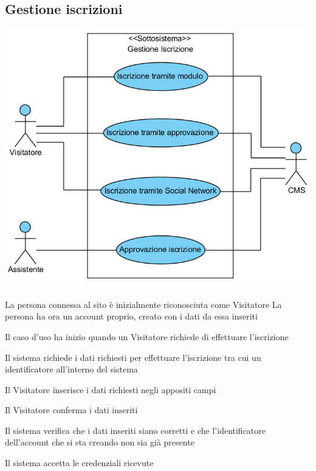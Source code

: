 \subsection{Gestione iscrizioni}
\begin{center}
   \includegraphics[width=\textwidth]{assets/visualParadigm/GestioneIscrizione}
\end{center}
{}
{La persona connessa al sito è inizialmente riconosciuta come Visitatore}
{La persona ha ora un account proprio, creato con i dati da essa inseriti}
{\begin{enumCU}
	\item Il caso d'uso ha inizio quando un Visitatore richiede di effettuare l'iscrizione
	\item Il sistema richiede i dati richiesti per effettuare l'iscrizione tra cui un identificatore all'interno del sistema
	\item Il Visitatore inserisce i dati richiesti negli appositi campi \label{cuiscr:3}
	\item Il Visitatore conferma i dati inseriti
	\item Il sistema verifica che i dati inseriti siano corretti e che l'identificatore dell'account che si sta creando non sia già presente \label{cuiscr:5}
	\item Il sistema accetta le credenziali ricevute
\end{enumCU}}
%
